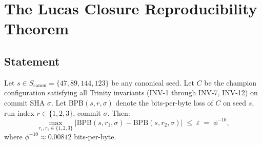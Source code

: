 \section{The Lucas Closure Reproducibility Theorem}
\label{sec:29-repro-thm}

\subsection{Statement}

\begin{theorem}
\label{thm:29-repro}
Let $s \in S_{\mathrm{canon}} = \{47, 89, 144, 123\}$ be any
canonical seed.  Let $C$ be the champion configuration satisfying
all Trinity invariants (INV-1 through INV-7, INV-12) on commit SHA
$\sigma$.  Let $\mathrm{BPB}(s, r, \sigma)$ denote the bits-per-byte
loss of $C$ on seed $s$, run index $r \in \{1, 2, 3\}$, commit
$\sigma$.  Then:
\begin{equation}
  \max_{r_1, r_2 \in \{1,2,3\}} \bigl\lvert
    \mathrm{BPB}(s, r_1, \sigma) - \mathrm{BPB}(s, r_2, \sigma)
  \bigr\rvert \;\le\; \varepsilon \;=\; \phi^{-10},
  \label{eq:repro-theorem}
\end{equation}
where $\phi^{-10} \approx 0.00812$ bits-per-byte.
\end{theorem}

